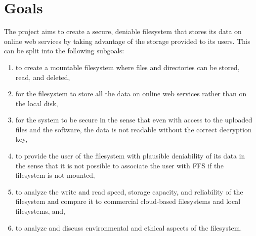
\section{Goals}


The project aims to create a secure, deniable filesystem that stores its data on online web services by taking advantage of the storage provided to its users. This can be split into the following subgoals:
\begin{enumerate}
\item to create a mountable filesystem where files and directories can be stored, read, and deleted,
\item for the filesystem to store all the data on online web services rather than on the local disk,
\item for the system to be secure in the sense that even with access to the uploaded files and the software, the data is not readable without the correct decryption key, 
\item to provide the user of the filesystem with plausible deniability of its data in the sense that it is not possible to associate the user with FFS if the filesystem is not mounted,
\item to analyze the write and read speed, storage capacity, and reliability of the filesystem and compare it to commercial cloud-based filesystems and local filesystems, and,
\item to analyze and discuss environmental and ethical aspects of the filesystem.
\end{enumerate}

